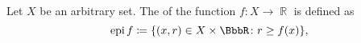 \begin{definition}\label{def:epigraph}
  Let \( X \) be an arbitrary set. The  of the function \( f: X \to \BbbR \) is defined as
  \begin{equation*}
    \epi f \coloneqq \{ (x, r) \in X \times \BbbR \colon r \geq f(x) \},
  \end{equation*}
\end{definition}

\begin{definition}\label{def:vector_field}
\end{definition}
